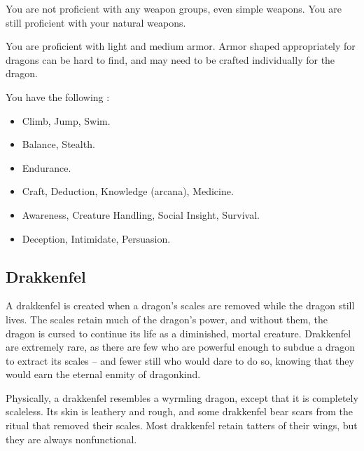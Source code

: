             You are not proficient with any weapon groups, even simple weapons.
            You are still proficient with your natural weapons.

            You are proficient with light and medium armor.
            Armor shaped appropriately for dragons can be hard to find, and may need to be crafted individually for the dragon.

            You have the following :
            \begin{itemize}
                \item {} Climb, Jump, Swim.
                \item {} Balance, Stealth.
                \item {} Endurance.
                \item {} Craft, Deduction, Knowledge (arcana), Medicine.
                \item {} Awareness, Creature Handling, Social Insight, Survival.
                \item {} Deception, Intimidate, Persuasion.
            \end{itemize}

    \subsection{Drakkenfel}

        A drakkenfel is created when a dragon's scales are removed while the dragon still lives. The scales retain much of the dragon's power, and without them, the dragon is cursed to continue its life as a diminished, mortal creature.
        Drakkenfel are extremely rare, as there are few who are powerful enough to subdue a dragon to extract its scales -- and fewer still who would dare to do so, knowing that they would earn the eternal enmity of dragonkind.

        Physically, a drakkenfel resembles a wyrmling dragon, except that it is completely scaleless.
        Its skin is leathery and rough, and some drakkenfel bear scars from the ritual that removed their scales.
        Most drakkenfel retain tatters of their wings, but they are always nonfunctional.

